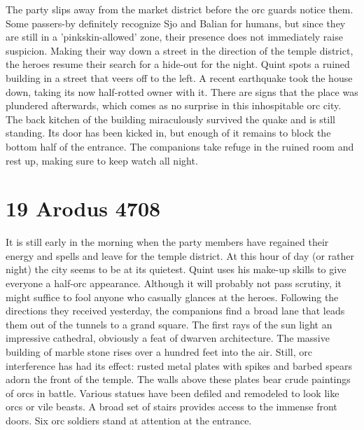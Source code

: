 The party slips away from the market district before the orc guards notice them. Some passers-by definitely recognize Sjo and Balian for humans, but since they are still in a 'pinkskin-allowed' zone, their presence does not immediately raise suspicion. Making their way down a street in the direction of the temple district, the heroes resume their search for a hide-out for the night. Quint spots a ruined building in a street that veers off to the left. A recent earthquake took the house down, taking its now half-rotted owner with it. There are signs that the place was plundered afterwards, which comes as no surprise in this inhospitable orc city. The back kitchen of the building miraculously survived the quake and is still standing. Its door has been kicked in, but enough of it remains to block the bottom half of the entrance. The companions take refuge in the ruined room and rest up, making sure to keep watch all night.\\

\section{19 Arodus 4708}

It is still early in the morning when the party members have regained their energy and spells and leave for the temple district. At this hour of day (or rather night) the city seems to be at its quietest. Quint uses his make-up skills to give everyone a half-orc appearance. Although it will probably not pass scrutiny, it might suffice to fool anyone who casually glances at the heroes. Following the directions they received yesterday, the companions find a broad lane that leads them out of the tunnels to a grand square. The first rays of the sun light an impressive cathedral, obviously a feat of dwarven architecture. The massive building of marble stone rises over a hundred feet into the air. Still, orc interference has had its effect: rusted metal plates with spikes and barbed spears adorn the front of the temple. The walls above these plates bear crude paintings of orcs in battle. Various statues have been defiled and remodeled to look like orcs or vile beasts. A broad set of stairs provides access to the immense front doors. Six orc soldiers stand at attention at the entrance.\\

